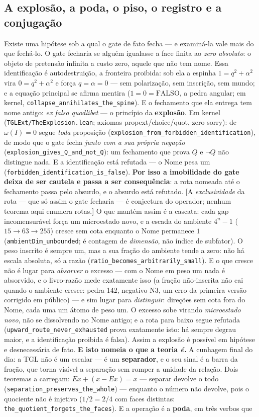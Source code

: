 \documentclass[11pt]{article}
\theoremstyle{definition}\newtheorem{deriv}{Derivação}
\begin{document}
\subsection*{A explosão, a poda, o piso, o registro e a conjugação}Existe uma hipótese sob a qual o gate de fato fecha --- e examiná-la vale mais do que fechá-lo. O gate fecharia se alguém igualasse a face finita ao \emph{zero absoluto}: o objeto de pretensão infinita a custo zero, aquele que não tem nome. Essa identificação é autodestruição, a fronteira proibida: sob ela a espinha $1=q^2+\alpha^2$ vira $0=q^2+\alpha^2$ e força $q=\alpha=0$ --- sem polarização, sem inscrição, sem mundo; e a equação principal se afirma mentira ($1=0=\text{FALSO}$, a pedra angular; em kernel, \texttt{collapse\_annihilates\_the\_spine}). E o fechamento que ela entrega tem nome antigo: \emph{ex falso quodlibet} --- o princípio da \textbf{explosão}. Em kernel (\texttt{TGLExt/TheExplosion.lean}; axiomas propext/choice/quot, zero sorry): de $\omega(I)=0$ segue \emph{toda} proposição (\texttt{explosion\_from\_forbidden\_identification}), de modo que o gate fecha \emph{junto com a sua própria negação} (\texttt{explosion\_gives\_Q\_and\_not\_Q}): um fechamento que prova $Q$ e $\lnot Q$ não distingue nada. E a identificação está refutada --- o Nome pesa um (\texttt{forbidden\_identification\_is\_false}). \textbf{Por isso a imobilidade do gate deixa de ser cautela e passa a ser consequência}: a rota nomeada até o fechamento passa pelo absurdo, e o absurdo está refutado. [A \emph{exclusividade} da rota --- que só assim o gate fecharia --- é conjectura do operador; nenhum teorema aqui enumera rotas.] O que mantém assim é a cascata: cada gap incomensurável força um microestado novo, e a escada do ambiente $4^n-1$ ($15\to63\to255$) cresce sem cota enquanto o Nome permanece $1$ (\texttt{ambientDim\_unbounded}; é contagem de \emph{dimensão}, não índice de subfator). O peso inscrito é sempre um, mas a sua fração do ambiente tende a zero: não há escala absoluta, só a razão (\texttt{ratio\_becomes\_arbitrarily\_small}). E o que cresce não é lugar para \emph{absorver} o excesso --- com o Nome em peso um nada é absorvido, e o livro-razão mede exatamente isso (a fração não-inscrita não cai quando o ambiente cresce: pedra 142, negativo N3, um erro da primeira versão corrigido em público) --- e sim lugar para \emph{distinguir}: direções sem cota fora do Nome, cada uma um átomo de peso um. O excesso sobe virando \emph{microestado novo}, não se dissolvendo no Nome antigo; e a rota para baixo segue refutada (\texttt{upward\_route\_never\_exhausted} prova exatamente isto: há sempre degrau maior, e a identificação proibida é falsa). Assim a explosão é possível em hipótese e desnecessária de fato. \textbf{E isto nomeia o que a teoria \emph{é}.} A cunhagem final do dia: a TGL não é um escalar --- é um \textbf{separador}, e o seu sinal é a barra da fração, que torna visível a separação sem romper a unidade da relação. Dois teoremas a carregam: $Ex+(x-Ex)=x$ --- separar devolve o todo (\texttt{separation\_preserves\_the\_whole}) --- enquanto o número não devolve, pois o quociente não é injetivo ($1/2=2/4$ com faces distintas: \texttt{the\_quotient\_forgets\_the\_faces}). E a operação é a \textbf{poda}, em três verbos que 
\end{document}
